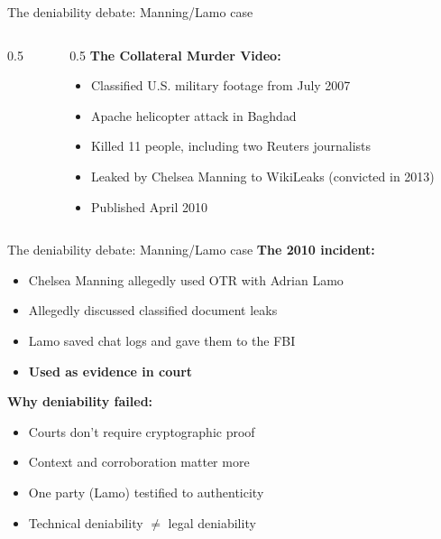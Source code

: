 \ifdefined\PRESENTATION\else\PassOptionsToClass{handout}{beamer}\fi\documentclass[aspectratio=169, lualatex]{beamer}
\begin{document}
\begin{frame}{The deniability debate: Manning/Lamo case}
	\begin{columns}[c]
		\begin{column}{0.5\textwidth}
		\end{column}
		\begin{column}{0.5\textwidth}
			\textbf{The Collateral Murder Video:}
			\begin{itemize}
				\item Classified U.S. military footage from July 2007
				\item Apache helicopter attack in Baghdad
				\item Killed 11 people, including two Reuters journalists
				\item Leaked by Chelsea Manning to WikiLeaks (convicted in 2013)
				\item Published April 2010
			\end{itemize}
		\end{column}
	\end{columns}
\end{frame}

\begin{frame}{The deniability debate: Manning/Lamo case}
	\textbf{The 2010 incident:}
	\begin{itemize}
		\item Chelsea Manning allegedly used OTR with Adrian Lamo
		\item Allegedly discussed classified document leaks
		\item Lamo saved chat logs and gave them to the FBI
		\item \textbf{Used as evidence in court}
	\end{itemize}
	\textbf{Why deniability failed:}
	\begin{itemize}
		\item Courts don't require cryptographic proof
		\item Context and corroboration matter more
		\item One party (Lamo) testified to authenticity
		\item Technical deniability $\neq$ legal deniability
	\end{itemize}
\end{frame}
\end{document}
